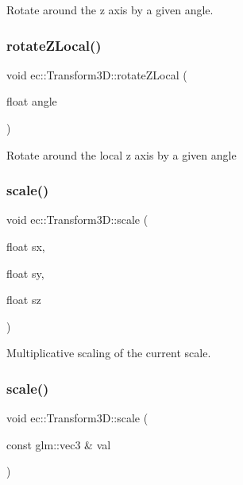 Rotate around the z axis by a given angle. \mbox{\label{classec_1_1_transform3_d_a9079ea3fc1c171f2e70fb489c804fc52}} 
\subsubsection{\texorpdfstring{rotate\+Z\+Local()}{rotateZLocal()}}
{\footnotesize\ttfamily void ec\+::\+Transform3\+D\+::rotate\+Z\+Local (\begin{DoxyParamCaption}\item[{float}]{angle }\end{DoxyParamCaption})}

Rotate around the local z axis by a given angle \mbox{\label{classec_1_1_transform3_d_a3f4636cea71bac0aa965bc567e649e03}} 
\subsubsection{\texorpdfstring{scale()}{scale()}\hspace{0.1cm}{\footnotesize\ttfamily [1/3]}}
{\footnotesize\ttfamily void ec\+::\+Transform3\+D\+::scale (\begin{DoxyParamCaption}\item[{float}]{sx,  }\item[{float}]{sy,  }\item[{float}]{sz }\end{DoxyParamCaption})}

Multiplicative scaling of the current scale. \mbox{\label{classec_1_1_transform3_d_a5ddb66479416948acf2406f544aaaa0f}} 
\subsubsection{\texorpdfstring{scale()}{scale()}\hspace{0.1cm}{\footnotesize\ttfamily [2/3]}}
{\footnotesize\ttfamily void ec\+::\+Transform3\+D\+::scale (\begin{DoxyParamCaption}\item[{const glm\+::vec3 \&}]{val }\end{DoxyParamCaption})}

